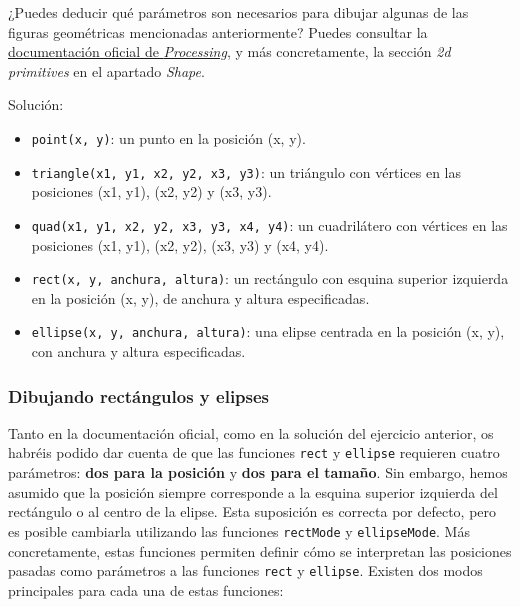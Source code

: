 \documentclass[
  spanish,
  11pt,
  a4paper,
  DIV=11,
  numbers=noendperiod]{scrartcl}
\providecommand{\tightlist}{%
  \setlength{\itemsep}{0pt}\setlength{\parskip}{0pt}}
\begin{document}
\begin{tcolorbox}[enhanced jigsaw, toprule=.15mm, coltitle=black, titlerule=0mm, opacitybacktitle=0.6, breakable, colback=white, colframe=quarto-callout-note-color-frame, colbacktitle=quarto-callout-note-color!10!white, opacityback=0, title={Ejercicio 5 - Deducción de parámetros}, bottomtitle=1mm, rightrule=.15mm, toptitle=1mm, left=2mm, bottomrule=.15mm, leftrule=.75mm, arc=.35mm]

¿Puedes deducir qué parámetros son necesarios para dibujar algunas de las figuras geométricas mencionadas anteriormente? Puedes consultar la \href{https://processing.org/reference\#shape}{documentación oficial de \emph{Processing}}, y más concretamente, la sección \emph{2d primitives} en el apartado \emph{Shape}.

Solución:

\begin{itemize}
\tightlist
\item
  \texttt{point(x,\ y)}: un punto en la posición (x, y).
\item
  \texttt{triangle(x1,\ y1,\ x2,\ y2,\ x3,\ y3)}: un triángulo con vértices en las posiciones (x1, y1), (x2, y2) y (x3, y3).
\item
  \texttt{quad(x1,\ y1,\ x2,\ y2,\ x3,\ y3,\ x4,\ y4)}: un cuadrilátero con vértices en las posiciones (x1, y1), (x2, y2), (x3, y3) y (x4, y4).
\item
  \texttt{rect(x,\ y,\ anchura,\ altura)}: un rectángulo con esquina superior izquierda en la posición (x, y), de anchura y altura especificadas.
\item
  \texttt{ellipse(x,\ y,\ anchura,\ altura)}: una elipse centrada en la posición (x, y), con anchura y altura especificadas.
\end{itemize}

\end{tcolorbox}

\subsubsection{Dibujando rectángulos y elipses}

\label{dibujando-rectángulos-y-elipses}

Tanto en la documentación oficial, como en la solución del ejercicio anterior, os habréis podido dar cuenta de que las funciones \texttt{rect} y \texttt{ellipse} requieren cuatro parámetros: \textbf{dos para la posición} y \textbf{dos para el tamaño}. Sin embargo, hemos asumido que la posición siempre corresponde a la esquina superior izquierda del rectángulo o al centro de la elipse. Esta suposición es correcta por defecto, pero es posible cambiarla utilizando las funciones \texttt{rectMode} y \texttt{ellipseMode}. Más concretamente, estas funciones permiten definir cómo se interpretan las posiciones pasadas como parámetros a las funciones \texttt{rect} y \texttt{ellipse}. Existen dos modos principales para cada una de estas funciones:
\end{document}
